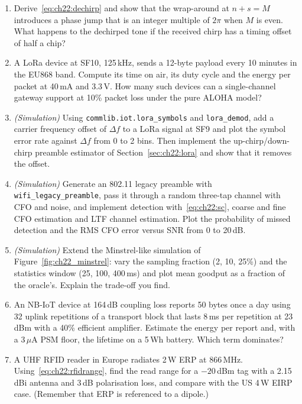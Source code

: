 \begin{enumerate}[label=\thechapter.\arabic*]
one another by four chips, and compute the cross-correlation between symbol 0 and symbol 8. Why might
a receiver that detects with a discriminator (that is, noncoherently) prefer this code set to a set of
16 Walsh codes?
\item Derive~\eqref{eq:ch22:dechirp} and show that the wrap-around at $n+s=M$ introduces a phase jump
that is an integer multiple of $2\pi$ when $M$ is even. What happens to the dechirped tone if the
received chirp has a timing offset of half a chip?
\item A LoRa device at SF10, 125\,kHz, sends a 12-byte payload every 10 minutes in the EU868 band.
Compute its time on air, its duty cycle and the energy per packet at 40\,mA and 3.3\,V. How many such
devices can a single-channel gateway support at 10\% packet loss under the pure ALOHA model?
\item \emph{(Simulation)} Using \texttt{commlib.iot.lora\_symbols} and \texttt{lora\_demod}, add a
carrier frequency offset of $\Delta f$ to a LoRa signal at SF9 and plot the symbol error rate against
$\Delta f$ from 0 to 2 bins. Then implement the up-chirp/down-chirp preamble estimator of
Section~\ref{sec:ch22:lora} and show that it removes the offset.
\item \emph{(Simulation)} Generate an 802.11 legacy preamble with \texttt{wifi\_legacy\_preamble}, pass
it through a random three-tap channel with CFO and noise, and implement detection
with~\eqref{eq:ch22:sc}, coarse and fine CFO estimation and LTF channel estimation. Plot the
probability of missed detection and the RMS CFO error versus SNR from 0 to 20\,dB.
\item \emph{(Simulation)} Extend the Minstrel-like simulation of Figure~\ref{fig:ch22_minstrel}: vary
the sampling fraction (2, 10, 25\%) and the statistics window (25, 100, 400\,ms) and plot mean goodput
as a fraction of the oracle's. Explain the trade-off you find.
\item An NB-IoT device at 164\,dB coupling loss reports 50 bytes once a day using 32 uplink repetitions
of a transport block that lasts 8\,ms per repetition at 23\,dBm with a 40\% efficient amplifier.
Estimate the energy per report and, with a 3\,$\mu$A PSM floor, the lifetime on a 5\,Wh battery. Which
term dominates?
\item A UHF RFID reader in Europe radiates 2\,W ERP at 866\,MHz. Using~\eqref{eq:ch22:rfidrange}, find
the read range for a $-20$\,dBm tag with a 2.15\,dBi antenna and 3\,dB polarisation loss, and compare
with the US 4\,W EIRP case. (Remember that ERP is referenced to a dipole.)
\end{enumerate}

